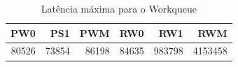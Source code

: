 \begin{table}[!htb]
    \centering
    \begin{center}
        \begin{tabular}{|r|r|r|r|r|r|}
            \toprule
                PW0 &    PS1 &    PWM &    RW0 &     RW1 &    RWM \\
            \midrule
                80526 &  73854 &  86198 & 84635 &  983798 &  4153458 \\
            \bottomrule
        \end{tabular}
    \end{center}
    \caption{Latência máxima para o Workqueue}
    \label{table:max-workqueue}
\end{table}
